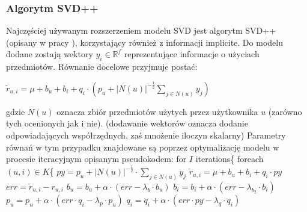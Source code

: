 \documentclass{pracamgr}
\begin{document}
    \subsubsection{Algorytm SVD++}
     Najczęściej używanym rozszerzeniem modelu SVD jest algorytm SVD++ (opisany w pracy \cite{SVD++}), korzystający również z informacji implicite.
     Do modelu dodane zostają wektory $y_i\in\mathbb{R}^f$ reprezentujące informacje o użyciach przedmiotów.
     Równanie docelowe przyjmuje postać:
     \begin{center}
      $\tilde{r}_{u,i}=\mu+b_u+b_i+q_i\cdot\left(p_u +|N(u)|^{-\frac{1}{2}}\sum\limits_{j\in N(u)}y_j\right)$
     \end{center}
     gdzie $N(u)$ oznacza zbiór przedmiotów użytych przez użytkownika $u$ (zarówno tych ocenionych jak i nie).\newline
     {\scriptsize
      (dodawanie wektorów oznacza dodanie odpowiadających współrzędnych, zaś mnożenie iloczyn skalarny)
     }\newpage
     Parametry równań w tym przypadku znajdowane są poprzez optymalizację modelu w procesie iteracyjnym opisanym pseudokodem:\newline\newline
     \hspace*{16pt}	for $I$ iterations\{\newline
     \hspace*{32pt}		foreach $(u,i)\in K$\{\newline
     \hspace*{48pt}			$py=p_u +|N(u)|^{-\frac{1}{2}}\cdot\sum\limits_{j\in N(u)}y_j$\newline
     \hspace*{48pt}			$\tilde{r}_{u,i}=\mu+b_u+b_i+q_i\cdot py$\newline
     \hspace*{48pt}			$err=\tilde{r}_{u,i}-r_{u,i}$\newline
     \hspace*{48pt}			$b_u=b_u+\alpha\cdot(err-\lambda_b\cdot b_u)$\newline
     \hspace*{48pt}			$b_i=b_i+\alpha\cdot(err-\lambda_{b_2}\cdot b_i)$\newline
     \hspace*{48pt}			$p_u=p_u+\alpha\cdot(err\cdot q_i-\lambda_p\cdot p_u)$\newline
     \hspace*{48pt}			$q_i=q_i+\alpha\cdot(err\cdot py-\lambda_q\cdot q_i)$\newline
\end{document}
